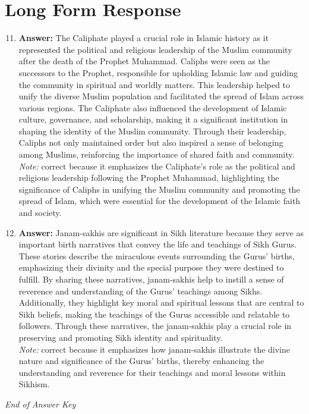 \documentclass[12pt]{article}
\begin{document}
\section*{Long Form Response}
\begin{enumerate}[label=\arabic*.]
\setcounter{enumi}{10}
\item \textbf{Answer:} The Caliphate played a crucial role in Islamic history as it represented the political and religious leadership of the Muslim community after the death of the Prophet Muhammad. Caliphs were seen as the successors to the Prophet, responsible for upholding Islamic law and guiding the community in spiritual and worldly matters. This leadership helped to unify the diverse Muslim population and facilitated the spread of Islam across various regions. The Caliphate also influenced the development of Islamic culture, governance, and scholarship, making it a significant institution in shaping the identity of the Muslim community. Through their leadership, Caliphs not only maintained order but also inspired a sense of belonging among Muslims, reinforcing the importance of shared faith and community.
\\ \textit{Note:} correct because it emphasizes the Caliphate's role as the political and religious leadership following the Prophet Muhammad, highlighting the significance of Caliphs in unifying the Muslim community and promoting the spread of Islam, which were essential for the development of the Islamic faith and society.
\item \textbf{Answer:} Janam-sakhis are significant in Sikh literature because they serve as important birth narratives that convey the life and teachings of Sikh Gurus. These stories describe the miraculous events surrounding the Gurus' births, emphasizing their divinity and the special purpose they were destined to fulfill. By sharing these narratives, janam-sakhis help to instill a sense of reverence and understanding of the Gurus' teachings among Sikhs. Additionally, they highlight key moral and spiritual lessons that are central to Sikh beliefs, making the teachings of the Gurus accessible and relatable to followers. Through these narratives, the janam-sakhis play a crucial role in preserving and promoting Sikh identity and spirituality.
\\ \textit{Note:} correct because it emphasizes how janam-sakhis illustrate the divine nature and significance of the Gurus' births, thereby enhancing the understanding and reverence for their teachings and moral lessons within Sikhism.
\end{enumerate}

\vfill
\noindent\textit{End of Answer Key}
\end{document}

